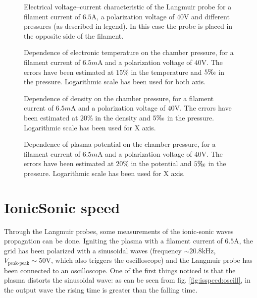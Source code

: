 \documentclass[11pt,a4 paper]{article}
\begin{document}
\begin{figure}[H]
	\centering
	\caption{Electrical voltage--current characteristic of the Langmuir probe for a filament current of $6.5\si{\ampere}$, a polarization voltage of $40\si{\volt}$ and different pressures (as described in legend). In this case the probe is placed in the opposite side of the filament.}
	\label{fig:Lang:sx_p}
\end{figure}

\begin{figure}[H]
	\centering
	\caption{Dependence of electronic temperature on the chamber pressure, for a filament current of $6.5\si{m\ampere}$ and a polarization voltage of $40\si{\volt}$. The errors have been estimated at $15\%$ in the temperature and $5\tcperthousand$ in the pressure. Logarithmic scale has been used for both axis.}
	\label{fig:Lang:Te_p}
\end{figure}

\begin{figure}[H]
	\centering
	\caption{Dependence of density on the chamber pressure, for a filament current of $6.5\si{m\ampere}$ and a polarization voltage of $40\si{\volt}$. The errors have been estimated at $20\%$ in the density and $5\tcperthousand$ in the pressure. Logarithmic scale has been used for X axis.}
	\label{fig:Lang:n_p}
\end{figure}

\begin{figure}[H]
	\centering
	\caption{Dependence of plasma potential on the chamber pressure, for a filament current of $6.5\si{m\ampere}$ and a polarization voltage of $40\si{\volt}$. The errors have been estimated at $20\%$ in the potential and $5\tcperthousand$ in the pressure. Logarithmic scale has been used for X axis.}
	\label{fig:Lang:Vp_p}
\end{figure}

\section{IonicSonic speed}
Through the Langmuir probes, some measurements of the ionic-sonic waves propagation can be done. Igniting the plasma with a filament current of $6.5\si{\ampere}$, the grid has been polarized with a sinusoidal waves (frequency $\sim20.8\si{\kilo\hertz}$, $V_\text{peak-peak}\sim50\si{\volt}$, which also triggers the oscilloscope) and the Langmuir probe has been connected to an oscilloscope. One of the first things noticed is that the plasma distorts the sinusoidal wave: as can be seen from fig. \ref{fig:isspeed:oscill}, in the output wave the rising time is greater than the falling time.
\end{document}
